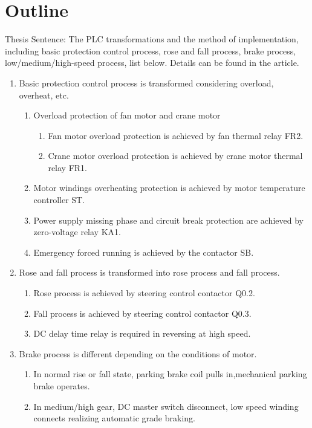 \documentclass[a4paper]{article}
\renewcommand{\Large}{\fontsize{12pt}{\baselineskip}\selectfont}
\begin{document}
\section*{ \Large Outline}
Thesis Sentence: The PLC transformations and the method of implementation, including basic protection control process, rose and fall process, brake process, low/medium/high-speed process, list below. Details can be found in the article.
\begin{enumerate}
\item Basic protection control process is transformed considering overload, overheat, etc.
	\begin{enumerate}
\item Overload protection of fan motor and crane motor
		\begin{enumerate}
\item Fan motor overload protection is achieved  by fan thermal relay FR2.
\item Crane motor overload protection is achieved  by crane motor thermal relay FR1.
		\end{enumerate}
\item Motor windings overheating protection is achieved by  motor temperature controller ST.
\item Power supply missing phase and circuit break protection are achieved by  zero-voltage relay KA1.
\item Emergency forced running is achieved by the contactor SB.
	\end{enumerate}
\item Rose and fall process is transformed into rose process and fall process.
	\begin{enumerate}
\item Rose process  is achieved by steering control contactor Q0.2.
\item Fall process is  achieved by steering control contactor Q0.3.
\item DC delay time relay is required in reversing at high speed.
	\end{enumerate}
\item Brake process is different depending on the conditions of motor.
	\begin{enumerate} 
\item In normal rise or fall state, parking brake   coil pulls in,mechanical parking brake operates.
\item In medium/high gear, DC master switch disconnect, low speed winding connects realizing automatic grade braking.

\end{enumerate}
\end{enumerate}
\end{document}

